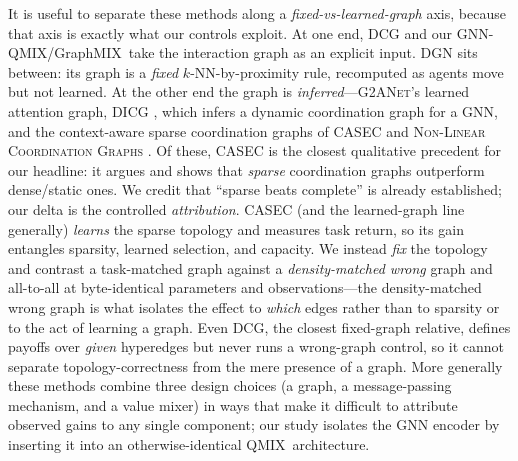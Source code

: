 \documentclass[manuscript, screen, review]{jair}
\providecommand{\citep}{\parencite}
\newcommand{\algoname}[1]{\textsc{#1}}
\newcommand{\qmix}{\algoname{QMIX}}
\newcommand{\gnnqmix}{\algoname{GNN-QMIX}}
\begin{document}
It is useful to separate these methods along a \emph{fixed-vs-learned-graph}
axis, because that axis is exactly what our controls exploit. At one end,
\algoname{DCG} and our \gnnqmix/GraphMIX\ take the interaction graph as an
explicit input. \algoname{DGN} sits between: its graph is a \emph{fixed}
$k$-NN-by-proximity rule, recomputed as agents move but not learned. At the
other end the graph is \emph{inferred}---\algoname{G2ANet}'s learned attention
graph, \algoname{DICG} \citep{li_2021_dicg}, which infers a dynamic
coordination graph for a GNN, and the context-aware sparse coordination graphs
of \algoname{CASEC} \citep{wang_2022_casec} and \algoname{Non-Linear
Coordination Graphs} \citep{kang_2022_nonlinearcg}. Of these, \algoname{CASEC}
is the closest qualitative precedent for our headline: it argues and shows that
\emph{sparse} coordination graphs outperform dense/static ones. We credit that
``sparse beats complete'' is already established; our delta is the controlled
\emph{attribution}. CASEC (and the learned-graph line generally) \emph{learns}
the sparse topology and measures task return, so its gain entangles sparsity,
learned selection, and capacity. We instead \emph{fix} the topology and contrast
a task-matched graph against a \emph{density-matched wrong} graph and all-to-all
at byte-identical parameters and observations---the density-matched wrong graph
is what isolates the effect to \emph{which} edges rather than to sparsity or to
the act of learning a graph. Even \algoname{DCG}, the closest fixed-graph
relative, defines payoffs over \emph{given} hyperedges but never runs a
wrong-graph control, so it cannot separate topology-correctness from the mere
presence of a graph. More generally these methods combine three design choices
(a graph, a message-passing mechanism, and a value mixer) in ways that make it
difficult to attribute observed gains to any single component; our study
isolates the GNN encoder by inserting it into an otherwise-identical \qmix\
architecture.
\end{document}
